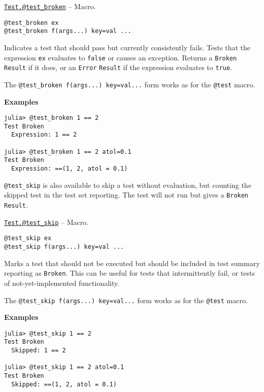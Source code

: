 \hypertarget{5668051953647432783}{} 
\hyperlink{5668051953647432783}{\texttt{Test.@test\_broken}}  -- {Macro.}

\begin{adjustwidth}{2em}{0pt}


\begin{verbatim}
@test_broken ex
@test_broken f(args...) key=val ...
\end{verbatim}

Indicates a test that should pass but currently consistently fails. Tests that the expression \texttt{ex} evaluates to \texttt{false} or causes an exception. Returns a \texttt{Broken} \texttt{Result} if it does, or an \texttt{Error} \texttt{Result} if the expression evaluates to \texttt{true}.

The \texttt{@test\_broken f(args...) key=val...} form works as for the \texttt{@test} macro.

\textbf{Examples}


\begin{verbatim}
julia> @test_broken 1 == 2
Test Broken
  Expression: 1 == 2

julia> @test_broken 1 == 2 atol=0.1
Test Broken
  Expression: ==(1, 2, atol = 0.1)
\end{verbatim}



\end{adjustwidth}

\texttt{@test\_skip} is also available to skip a test without evaluation, but counting the skipped test in the test set reporting. The test will not run but gives a \texttt{Broken} \texttt{Result}.


\hypertarget{612751920735042674}{} 
\hyperlink{612751920735042674}{\texttt{Test.@test\_skip}}  -- {Macro.}

\begin{adjustwidth}{2em}{0pt}


\begin{verbatim}
@test_skip ex
@test_skip f(args...) key=val ...
\end{verbatim}

Marks a test that should not be executed but should be included in test summary reporting as \texttt{Broken}. This can be useful for tests that intermittently fail, or tests of not-yet-implemented functionality.

The \texttt{@test\_skip f(args...) key=val...} form works as for the \texttt{@test} macro.

\textbf{Examples}


\begin{verbatim}
julia> @test_skip 1 == 2
Test Broken
  Skipped: 1 == 2

julia> @test_skip 1 == 2 atol=0.1
Test Broken
  Skipped: ==(1, 2, atol = 0.1)
\end{verbatim}



\end{adjustwidth}

